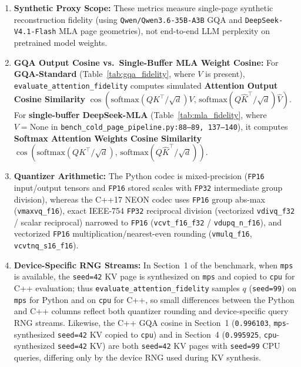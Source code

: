 \documentclass[10pt,twocolumn]{article}
\begin{document}
\begin{enumerate}
    \item \textbf{Synthetic Proxy Scope:} These metrics measure single-page synthetic reconstruction fidelity (using \texttt{Qwen/Qwen3.6-35B-A3B} GQA and \texttt{DeepSeek-V4.1-Flash} MLA page geometries), not end-to-end LLM perplexity on pretrained model weights.
    \item \textbf{GQA Output Cosine vs.\ Single-Buffer MLA Weight Cosine:} For \textbf{GQA-Standard} (Table~\ref{tab:gqa_fidelity}, where $V$ is present), \texttt{evaluate\_attention\_fidelity} computes simulated \textbf{Attention Output Cosine Similarity} $\cos(\text{softmax}(QK^\top/\sqrt{d})V,\, \text{softmax}(Q\hat{K}^\top/\sqrt{d})\hat{V})$. For \textbf{single-buffer DeepSeek-MLA} (Table~\ref{tab:mla_fidelity}, where $V=\text{None}$ in \texttt{bench\_cold\_page\_pipeline.py:88--89, 137--140}), it computes \textbf{Softmax Attention Weights Cosine Similarity} $\cos(\text{softmax}(QK^\top/\sqrt{d}),\, \text{softmax}(Q\hat{K}^\top/\sqrt{d}))$.
    \item \textbf{Quantizer Arithmetic:} The Python codec is mixed-precision (\texttt{FP16} input/output tensors and \texttt{FP16} stored scales with \texttt{FP32} intermediate group division), whereas the C++17 NEON codec uses \texttt{FP16} group abs-max (\texttt{vmaxvq\_f16}), exact IEEE-754 \texttt{FP32} reciprocal division (vectorized \texttt{vdivq\_f32} / scalar reciprocal) narrowed to \texttt{FP16} (\texttt{vcvt\_f16\_f32} / \texttt{vdupq\_n\_f16}), and vectorized \texttt{FP16} multiplication/nearest-even rounding (\texttt{vmulq\_f16}, \texttt{vcvtnq\_s16\_f16}).
    \item \textbf{Device-Specific RNG Streams:} In Section~1 of the benchmark, when \texttt{mps} is available, the \texttt{seed=42} KV page is synthesized on \texttt{mps} and copied to \texttt{cpu} for C++ evaluation; thus \texttt{evaluate\_attention\_fidelity} samples $q$ (\texttt{seed=99}) on \texttt{mps} for Python and on \texttt{cpu} for C++, so small differences between the Python and C++ columns reflect both quantizer rounding and device-specific query RNG streams. Likewise, the C++ GQA cosine in Section~1 (\texttt{0.996103}, \texttt{mps}-synthesized \texttt{seed=42} KV copied to \texttt{cpu}) and in Section~4 (\texttt{0.995925}, \texttt{cpu}-synthesized \texttt{seed=42} KV) are both \texttt{seed=42} KV pages with \texttt{seed=99} CPU queries, differing only by the device RNG used during KV synthesis.
\end{enumerate}
\end{document}
